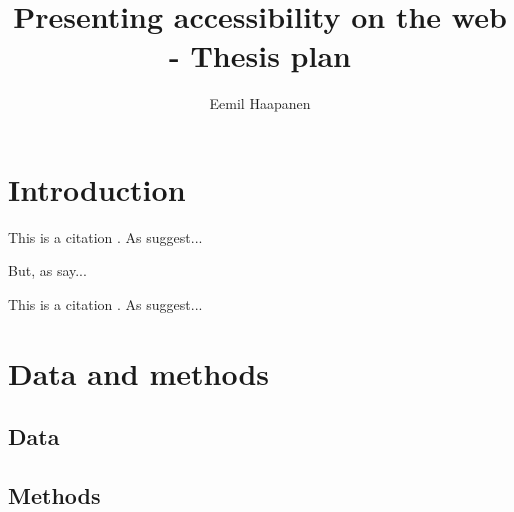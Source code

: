 \documentclass{article}
\title{Presenting accessibility on the web - Thesis plan}
\author{Eemil Haapanen}
\begin{document}
\maketitle

\section{Introduction}
This is a citation \parencite{hu2019}.
As \citeauthor{rot2013} suggest...

But, as \textcite{hu2019} say...

This is a citation \parencite{but2018}.
As \citeauthor{but2018} suggest...

\section{Data and methods}

\subsection{Data}
\subsection{Methods}

\printbibliography
\end{document}
